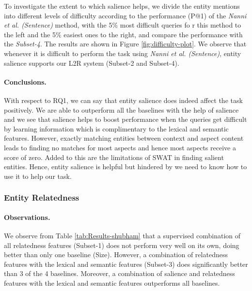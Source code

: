 To investigate the extent to which salience helps, we divide the entity mentions  into different levels of difficulty according to the performance (P@1) of the \textit{Nanni et al. (Sentence)} method, with the 5\% most difficult queries fo
r this method to the left and the 5\% easiest ones to the right, and compare the performance with the \textit{Subset-4}. The results are shown in Figure \ref{fig:difficulty-plot}. We observe that whenever it is difficult to perform the task using \textit{Nanni et al. (Sentence)}, entity salience supports our L2R system (Subset-2 and Subset-4).


\paragraph{\textbf{Conclusions.}}
With respect to RQ1, we can say that entity salience does indeed affect the task positively. We are able to outperform all the baselines with the help of salience and we see that salience helps to boost performance when the queries get difficult by learning information which is complimentary to the lexical and semantic features. However, exactly matching entities between context and aspect content leads to finding no matches for most aspects and hence most aspects receive a score of zero. Added to this are the limitations of SWAT in finding salient entities. Hence, entity salience is helpful but hindered by we need to know how to use it to help our task.


\subsubsection{Entity Relatedness}
\label{subsubsec:Entity Relatedness}

\paragraph{\textbf{Observations.}}
We observe from Table \ref{tab:Results-shubham} that a supervised combination of all relatedness features (Subset-1) does not perform very well on its own, doing better than only one baseline (Size). However, a combination of relatedness features with the lexical and semantic features (Subset-3) does significantly better than 3 of the 4 baselines. Moreover, a combination of salience and relatedness features with the lexical and semantic features outperforms all baselines. 

